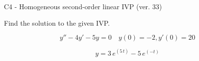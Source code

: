 \begin{exercise}
  \begin{exerciseTitle}C4 - Homogeneous second-order linear IVP (ver. 33)\end{exerciseTitle}
  \begin{exerciseStatement}
    
Find the solution to the given IVP.

    
\[y''-4y'-5y = 0 \hspace{1em} y(0) = -2 , y'(0) = 20\]

  \end{exerciseStatement}
  \begin{exerciseAnswer}
    
\[y= 3 \, e^{\left(5 \, t\right)} - 5 \, e^{\left(-t\right)}\]

  \end{exerciseAnswer}
\end{exercise}